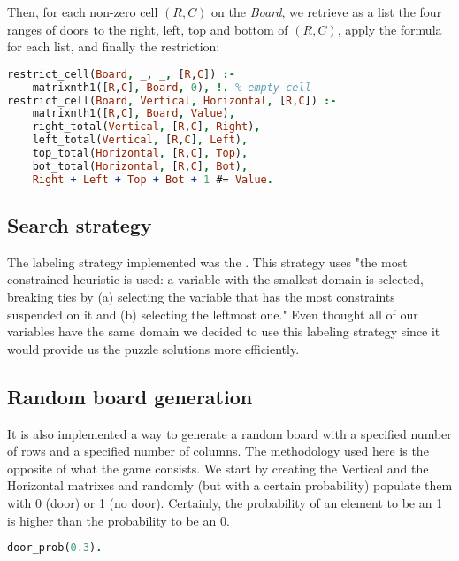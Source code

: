 \documentclass[runningheads]{llncs}
\newcommand*{\ttd}[1]{\texttt{\detokenize{#1}}}
\begin{document}
Then, for each non-zero cell $(R,C)$ on the \textsl{Board}, we retrieve as a list the four ranges of doors to the right, left, top and bottom of $(R,C)$, apply the formula for each list, and finally the restriction:

\begin{center}
\begin{minipage}{0.85\textwidth}
\centering\ttfamily
\begin{lstlisting}[language=Prolog]
restrict_cell(Board, _, _, [R,C]) :-
    matrixnth1([R,C], Board, 0), !. % empty cell
restrict_cell(Board, Vertical, Horizontal, [R,C]) :-
    matrixnth1([R,C], Board, Value),
    right_total(Vertical, [R,C], Right),
    left_total(Vertical, [R,C], Left),
    top_total(Horizontal, [R,C], Top),
    bot_total(Horizontal, [R,C], Bot),
    Right + Left + Top + Bot + 1 #= Value.
\end{lstlisting}
\end{minipage}
\end{center}

\subsection{Search strategy}
\label{subsec:searchstrategy}
The labeling strategy implemented was the \ttd{ffc}. This strategy uses "the most constrained heuristic is used: a variable with the smallest domain is selected, breaking ties by (a) selecting the variable that has the most constraints suspended on it and (b) selecting the leftmost one." Even thought all of our variables have the same domain we decided to use this labeling strategy since it would provide us the puzzle solutions more efficiently.

\subsection{Random board generation}
\label{subsec:randomboard}
It is also implemented a way to generate a random board with a specified number of rows and a specified number of columns. The methodology used here is the opposite of what the game consists. We start by creating the Vertical and the Horizontal matrixes and randomly (but with a certain probability) populate them with 0 (door) or 1 (no door). Certainly, the probability of an element to be an 1 is higher than the probability to be an 0.

\begin{center}
\begin{minipage}{0.85\textwidth}
\centering\ttfamily
\begin{lstlisting}[language=Prolog]
door_prob(0.3).
\end{lstlisting}
\end{minipage}
\end{center}
\end{document}
